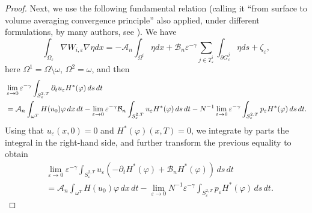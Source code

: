 \documentclass[10pt,a4paper]{amsart}
\numberwithin{equation}{section}
\begin{document}
\begin{proof}
Next, we use the following fundamental relation 
(calling it ``from surface to volume averaging
convergence principle'' \cite[Theorem 4.5]{DiGoShBook} 
also applied, under different
formulations, by many authors, see
\cite{OlSh95, ZuShDiffEq}).
 We have
\begin{equation}
\int _{\Omega _{\varepsilon }}\nabla W_{i,\varepsilon }\nabla \eta {dx%
}=-\mathcal{A}_n\int _{\Omega ^{i}}\eta {dx}+\mathcal{B}%
_n\varepsilon ^{-\gamma }\sum _{j\in \Upsilon _{\varepsilon
}^{i}}\int _{\partial G_{\varepsilon }^{j}}\eta {ds}+\zeta
_{\varepsilon },  \label{w limit relation}
\end{equation}
here $\Omega ^{1}=\Omega \setminus \omega $, $\Omega ^2=\omega $, and then
\begin{align*}
&\lim _{\varepsilon \to 0}\varepsilon ^{-\gamma }\int
_{S_{\varepsilon }^{2,T}}\partial _{t}u_{\varepsilon }H^{\ast
}(\varphi )\,ds\,dt \\
&=\mathcal{A}_n\int _{\omega ^{T}}H(u_0)\varphi {%
\,dx\,dt}-\lim _{\varepsilon \to 0}\varepsilon ^{-\gamma }%
\mathcal{B}_n\int _{S_{\varepsilon }^{2,T}}u_{\varepsilon }H^{\ast
}(\varphi )\,ds\,dt
-N^{-1}\lim _{\varepsilon \to 0}\varepsilon ^{-\gamma }\int
_{S_{\varepsilon }^{2,T}}p_{\varepsilon }H^{\ast }(\varphi )\,ds\,dt.
\end{align*}
Using that $u_{\varepsilon }(x,0)=0$ and $H^{\ast }(\varphi )(x,T)=0$, we
integrate by parts the integral in the right-hand side, and further
transform the previous equality to obtain
\begin{equation}
\begin{aligned}
&\lim _{\varepsilon \to 0}\varepsilon ^{-\gamma }\int
_{S_{\varepsilon }^{2,T}}u_{\varepsilon }(-\partial _{t}H^{\ast
}(\varphi )+\mathcal{B}_nH^{\ast }(\varphi ))\,ds\,dt    \\
&=\mathcal{A}_n\int _{\omega ^{T}}H(u_0)\varphi \,dx\,dt-\lim
_{\varepsilon \to 0}N^{-1}\varepsilon ^{-\gamma }\int
_{S_{\varepsilon }^{2,T}}p_{\varepsilon }H^{\ast }(\varphi )\,ds\,dt.
\end{aligned} \label{thm: u limit rel 1}
\end{equation}


\end{proof}
\end{document}
